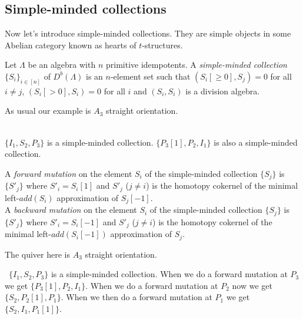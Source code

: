 \subsection{Simple-minded collections}
\indent Now let's introduce simple-minded collections. They are simple objects in some Abelian category known as hearts of $t$-structures.\\
\begin{definition}
Let $\Lambda$ be an algebra with $n$ primitive idempotents. A \textit{simple-minded collection} $\{S_i\}_{i\in [n]}$ of $D^b(\Lambda)$ is an $n$-element set such that $(S_i[\geq 0],S_j)=0$ for all $i\neq j$, $(S_i[>0], S_i) = 0$ for all $i$ and $(S_i,S_i)$ is a division algebra.\\
\end{definition}
\begin{example}
\indent As usual our example is $A_3$ straight orientation.\\
\\
\indent $\{I_1, S_2, P_3\}$ is a simple-minded collection. $\{P_3[1], P_2, I_1\}$ is also a simple-minded collection.
\end{example}
\begin{definition}
A \textit{forward mutation} on the element $S_i$ of the simple-minded collection $\{S_j\}$ is $\{S'_j\}$ where $S'_i = S_i[1]$ and $S'_j$ ($j\neq i$) is the homotopy cokernel of the minimal left-$add(S_i)$ approximation of $S_j[-1]$.\\
A \textit{backward mutation} on the element $S_i$ of the simple-minded collection $\{S_j\}$ is $\{S'_j\}$ where $S'_i = S_i[-1]$ and $S'_j$ ($j\neq i$) is the homotopy cokernel of the minimal left-$add(S_i[-1])$ approximation of $S_j$.\\
\end{definition}
\begin{example}
\indent The quiver here is $A_3$ straight orientation.\\
\
\indent $\{I_1, S_2, P_3\}$ is a simple-minded collection. When we do a forward mutation at $P_3$ we get $\{P_3[1], P_2, I_1\}$. When we do a forward mutation at $P_2$ now we get $\{S_2, P_2[1], P_1\}$. When we then do a forward mutation at $P_1$ we get $\{S_2, I_1, P_1[1]\}$.
\end{example}
